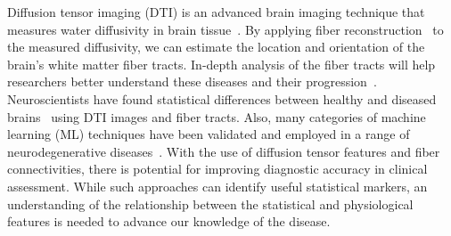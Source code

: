 Diffusion tensor imaging (DTI) is an advanced brain imaging technique that 
measures water diffusivity in %
brain tissue~\cite{basser2002diffusion}. By applying fiber reconstruction~\cite{SMITH20121924} to the measured diffusivity, we can estimate the location and orientation of the brain's white matter fiber tracts. %
In-depth analysis of the fiber tracts will help researchers better understand these diseases and their progression~\cite{zheng2014dti}. 
%
%
Neuroscientists have found statistical differences 
between healthy and diseased brains~\cite{zhang2015diffusion,acosta2016whole} 
using DTI images and fiber tracts. Also, many categories of machine learning (ML) techniques have been validated and employed in a range of neurodegenerative diseases~\cite{mateos2018structural,tanveer2020machine}. With the use of diffusion tensor features and fiber connectivities, there is potential for improving diagnostic accuracy in clinical assessment.
While such approaches can identify useful statistical markers, an understanding of the relationship between the statistical and physiological features is needed to advance our knowledge of the disease.

